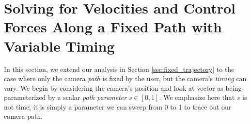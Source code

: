 \section{Solving for Velocities and Control Forces Along a Fixed Path with Variable Timing}
\label{sec:fixed_path}

In this section, we extend our analysis in Section \ref{sec:fixed_trajectory} to the case where only the camera \emph{path} is fixed by the user, but the camera's \emph{timing} can vary.
We begin by considering the camera's position and look-at vector as being parameterized by a scalar \emph{path parameter} $s \in [0,1]$.
We emphasize here that $s$ is not time; it is simply a parameter we can sweep from 0 to 1 to trace out our camera path.

\begin{Listing}[t]
\caption{
Computing the configuration of the quadrotor along a user-specified camera trajectory.
We begin by setting the quadrotor's position equal to the camera's position (line 1). We substitute linear acceleration and mass into Newton's Second Law to solve for net force (line 2).
We decompose the net force acting on our quadrotor into a thrust force and an external force, and we solve for thrust force (line 3).
We make the observation that a quadrotor can only generate thrust forces along its local up axis.
With this observation in mind, we set the quadrotor's local up axis equal to normalized thrust (line 4).
We use the quadrotor's local up axis, and the camera's look-at vector, to determine the quadrotor's orientation (lines 4--8).
This approach guarantees that the quadrotor's orientation is always consistent with equation (\ref{eqn:manipulator}).
}
\label{lst:q}
\begin{algorithmic}[1]

\small



\end{algorithmic}
\end{Listing}
